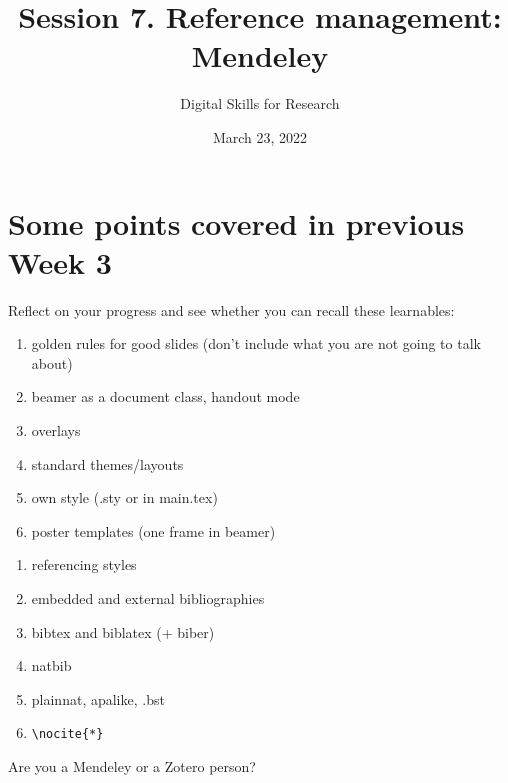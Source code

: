 \documentclass[a4paper,11pt]{article}
\title{Session 7. Reference management: Mendeley}
\author{Digital Skills for Research}
\date{March 23, 2022}
\begin{document}
\maketitle
\tableofcontents

\section*{Some points covered in previous Week 3}

Reflect on your progress and see whether you can recall these learnables:

\bigskip

\begin{tcolorbox}[width=.475\textwidth, nobeforeafter,height=6.5cm,valign=center, fonttitle=\bfseries,title=Session 5]
	\begin{enumerate}
		\item golden rules for good slides (don't include what you are not going to talk about)
		\item beamer as a document class, handout mode
		\item overlays
		\item standard themes/layouts
		\item own style (.sty or in main.tex)
		\item poster templates (one frame in beamer)

	\end{enumerate}
\end{tcolorbox}\hfill
%
\begin{tcolorbox}[width=.475\textwidth, nobeforeafter,height=6.5cm,valign=center,fonttitle=\bfseries,title=Session 6]
	\begin{enumerate}
		\item referencing styles
		\item embedded and external bibliographies
		\item bibtex and biblatex (+ biber)
		\item natbib 
		\item plainnat, apalike, .bst
		\item \verb|\nocite{*}|
	\end{enumerate}
\end{tcolorbox}

\bigskip

\begin{tcolorbox}[colback=red!5!white, colframe=red!75!black]
	\centering
	{\Large{Are you a Mendeley or a Zotero person?}}
\end{tcolorbox}
\end{document}

